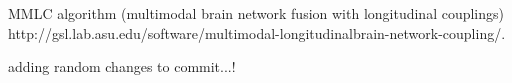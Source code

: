 MMLC algorithm (multimodal brain network 
fusion with longitudinal couplings)
http://gsl.lab.asu.edu/software/multimodal-longitudinalbrain-network-coupling/. 
\cite{Zhang2022}



adding random changes to commit...!


